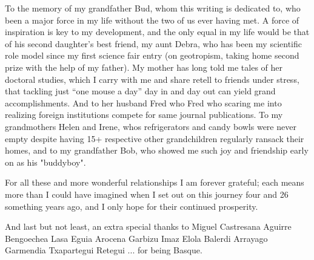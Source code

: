 To the memory of my grandfather Bud, whom this writing is dedicated to, who been a major force in my life without the two of us ever having met. A force of inspiration is key to my development, and the only equal in my life would be that of his second daughter's best friend, my aunt Debra, who has been my scientific role model since my first science fair entry (on geotropism, taking home second prize with the help of my father). My mother has long told me tales of her doctoral studies, which I carry with me and share retell to friends under stress, that tackling just ``one mouse a day'' day in and day out can yield grand accomplishments. And to her husband Fred who Fred who scaring me into realizing foreign institutions compete for same journal publications. To my grandmothers Helen and Irene, whos refrigerators and candy bowls were never empty despite having 15+ respective other grandchildren regularly ransack their homes, and to my grandfather Bob, who showed me such joy and friendship early on as his "buddyboy".

For all these and more wonderful relationships I am forever grateful; each means more than I could have imagined when I set out on this journey four and 26 something years ago, and I only hope for their continued prosperity.

And last but not least, an extra special thanks to Miguel Castresana Aguirre Bengoechea Lasa Eguia Arocena Garbizu Imaz Elola Balerdi Arrayago Garmendia Txapartegui Retegui  ... for being Basque.



